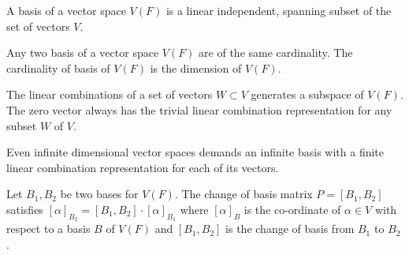 \begin{definition}[basis]
	A basis of a vector space $V(F)$ is a linear independent, spanning subset of the set of vectors $V$.
\end{definition}
\begin{definition}[dimension]
	Any two basis of a vector space $V(F)$ are of the same cardinality.
	The cardinality of basis of $V(F)$ is the dimension of $V(F)$.
\end{definition}
\begin{note}
	The linear combinations of a set of vectors $W \subset V$ generates a subspace of $V(F)$.
	The zero vector always has the trivial linear combination representation for any subset $W$ of $V$.
\end{note}
\begin{note}
	Even infinite dimensional vector spaces demands an infinite basis with a finite linear combination representation for each of its vectors.
\end{note}

\begin{definition}
	Let $B_1,B_2$ be two bases for $V(F)$.
	The change of basis matrix $P = [B_1,B_2]$ satisfies $[\alpha]_{B_2} = [B_1,B_2] \cdot [\alpha]_{B_1}$ where $[\alpha]_B$ is the co-ordinate of $\alpha \in V$ with respect to a basis $B$ of $V(F)$ and $[B_1,B_2]$ is the change of basis from $B_1$ to $B_2$.
\end{definition}

